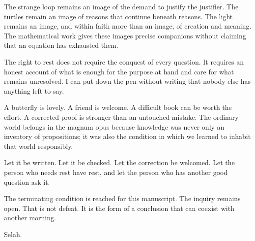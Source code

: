 \documentclass[10pt]{article}
\begin{document}
The strange loop remains an image of the demand to justify the justifier. The turtles remain an image of reasons that continue beneath reasons. The light remains an image, and within faith more than an image, of creation and meaning. The mathematical work gives these images precise companions without claiming that an equation has exhausted them.

The right to rest does not require the conquest of every question. It requires an honest account of what is enough for the purpose at hand and care for what remains unresolved. I can put down the pen without writing that nobody else has anything left to say.

A butterfly is lovely. A friend is welcome. A difficult book can be worth the effort. A corrected proof is stronger than an untouched mistake. The ordinary world belongs in the magnum opus because knowledge was never only an inventory of propositions; it was also the condition in which we learned to inhabit that world responsibly.

Let it be written. Let it be checked. Let the correction be welcomed. Let the person who needs rest have rest, and let the person who has another good question ask it.

The terminating condition is reached for this manuscript. The inquiry remains open. That is not defeat. It is the form of a conclusion that can coexist with another morning.

Selah.

\clearpage
\end{document}
